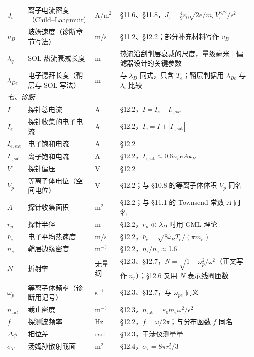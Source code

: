 \documentclass[12pt,a4paper,openany,oneside]{book}
\newcommand{\eps}{\varepsilon}
\begin{document}
{\begin{longtable}{@{}p{1.8cm}p{4.4cm}p{3.3cm}p{5.1cm}@{}}
$J_i$ & 离子电流密度（Child--Langmuir） & $\mathrm{A/m^2}$ & \S 11.6、\S 11.8，$J_i = \tfrac49\eps_0\sqrt{2e/m_i}\,V_s^{3/2}/s^2$ \\
$u_B$ & 玻姆速度（诊断章节写法） & m/s & \S 11.2、\S 12.2；部分补充材料写作 $v_B$ \\
$\lambda_q$ & SOL 热流衰减长度 & m & 热流沿刮削层衰减的尺度，量级毫米；偏滤器设计的关键参数 \\
$\lambda_{De}$ & 电子德拜长度（鞘层与 SOL 写法） & m & 与 $\lambda_D$ 同式，只含 $T_e$；鞘层判据用 $\lambda_{De}$ 与 $\lambda_i$ 比较 \\
\multicolumn{4}{l}{\textit{七、诊断}} \\
\midrule
$I$ & 探针总电流 & A & \S 12.2，$I = I_e - I_{\mathrm{i,sat}}$ \\
$I_e$ & 探针收集的电子电流 & A & \S 12.2，$I_e = I + |I_{\mathrm{i,sat}}|$ \\
$I_{\mathrm{e,sat}}$ & 电子饱和电流 & A & \S 12.2 \\
$I_{\mathrm{i,sat}}$ & 离子饱和电流 & A & \S 12.2，$I_{\mathrm{i,sat}} \approx 0.6n_eeAu_B$ \\
$V$ & 探针偏压 & V & \S 12.2 \\
$V_p$ & 等离子体电位（空间电位） & V & \S 12.2；与 \S 10.8 的等离子体体积 $V_p$ 同名 \\
$A$ & 探针收集面积 & $\mathrm{m^2}$ & \S 12.2；与 \S 11.1 的 Townsend 常数 $A$ 同名 \\
$r_p$ & 探针半径 & m & \S 12.2，$r_p\ll\lambda_D$ 时用 OML 理论 \\
$\bar v_e$ & 电子平均热速度 & m/s & \S 12.2，$\bar v_e = \sqrt{8k_{B}T_e/(\pi m_e)}$ \\
$n_s$ & 鞘层边缘密度 & $\mathrm{m^{-3}}$ & \S 12.2，$n_s/n_e \approx 0.6$ \\
$N$ & 折射率 & 无量纲 & \S 12.3、\S 12.7，$N = \sqrt{1-\omega_p^2/\omega^2}$（正文写作 $n_r$）；\S 12.6 又用 $N$ 表示线圈匝数 \\
$\omega_p$ & 等离子体频率（诊断用记号） & $\mathrm{s^{-1}}$ & \S 12.3、\S 12.7，与 $\omega_{pe}$ 同义 \\
$n_{cut}$ & 截止密度 & $\mathrm{m^{-3}}$ & \S 12.3，$n_{\mathrm{cut}} = \eps_0m_e\omega^2/e^2$ \\
$f$ & 探测波频率 & Hz & \S 12.2，$f = \omega/2\pi$；与分布函数 $f$ 同名 \\
$\Delta\phi$ & 相位差 & rad & \S 12.3，干涉仪测量量 \\
$\sigma_T$ & 汤姆孙散射截面 & $\mathrm{m^2}$ & \S 12.4，$\sigma_T = 8\pi r_e^2/3$ \\

\end{longtable}}
\end{document}
